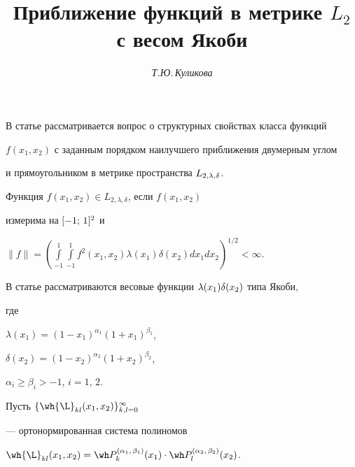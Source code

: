\author{\it Т.Ю.\,Куликова}




\title{Приближение функций в метрике $L_2$ с весом Якоби}





\date{}




\pagestyle{plain} %







\maketitle


\label{begin}





В статье рассматривается вопрос о структурных свойствах класса функций


$f(x_1,x_2)$ с заданным порядком наилучшего приближения двумерным углом


и прямоугольником в метрике пространства $L_{2,\lambda,\delta}$.


Функция $f(x_1,x_2)\in L_{2,\lambda,\delta}$, если $f(x_1,x_2)$


измерима на $[-1;\,1]^2$ и


$


\|f\|=\left(\int\limits_{-1}^1 \int\limits_{-1}^1 f^2(x_1,x_2)


\lambda(x_1)\delta(x_2)dx_1 dx_2\right)^{1/2}<\infty.


$





В статье рассматриваются весовые функции $\lambda(x_1)\delta(x_2)$ типа Якоби, 


где


$\lambda(x_1) = (1 - x_1)^{\alpha_1} (1 + x_1)^{\beta_1}$,


$\delta(x_2) = (1 - x_2)^{\alpha_2} (1 + x_2)^{\beta_2}$,


$\alpha_i\ge \beta_i> -1$, $i=1,\,2$.


Пусть $\{\wh{\L}_{kl}(x_1,x_2)\}_{k,l=0}^\infty$


--- ортонормированная система полиномов


$\wh{\L}_{kl}(x_1,x_2)= \PP(x_1)\cdot \PQ(x_2)$.


